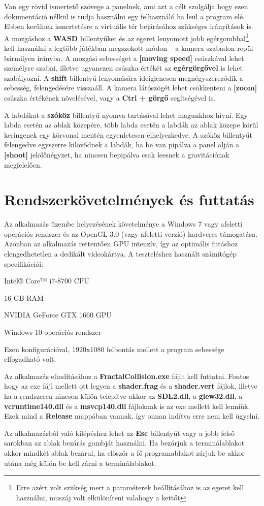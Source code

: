 Van egy rövid ismertető szövege a panelnek, ami azt a célt szolgálja hogy ezen dokumentáció nélkül is tudja használni egy felhasználó ha leül a program elé. Ebben kerülnek ismertetésre a virtuális tér bejárásához szükséges irányítások is. A mozgáshoz a \textbf{WASD} billentyűket és az egeret lenyomott jobb egérgombbal\footnote{Erre azért volt szükség mert a paraméterek beállításához is az egeret kell használni, muszáj volt elkülöníteni valahogy a kettőt} kell használni a legtöbb játékban megszokott módon -- a kamera szabadon repül bármilyen irányba. A mozgási sebességet a \textbf{[moving speed]} csúszkával lehet személyre szabni, illetve ugyanezen csúszka értékét az \textbf{egérgörgővel} is lehet szabályozni. A \textbf{shift} billentyű lenyomására ideiglenesen megnégyszereződik a sebesség, felengedésére visszaáll. A kamera látószögét lehet csökkenteni a \textbf{[zoom]} csúszka értékének növelésével, vagy a \textbf{Ctrl + görgő} segítségével is.

A labdákat a \textbf{szóköz} billentyű nyomva tartásával lehet magunkhoz hívni. Egy labda esetén az ablak közepére, több labda esetén a labdák az ablak közepe körül keringenek egy körvonal mentén egyenletesen elhelyezkedve. A szóköz billentyűt felengedve egyszerre kilövődnek a labdák, ha be van pipálva a panel alján a \textbf{[shoot]} jelölőnégyzet, ha nincsen bepipálva csak leesnek a gravitációnak megfelelően.
 
\cleardoublepage
\section{Rendszerkövetelmények és futtatás} 
\label{sec:futtatas} 
Az alkalmazás üzembe helyezésének követelménye a Windows 7 vagy afeletti operációs rendszer és az OpenGL 3.0 (vagy afeletti verzió) hardveres támogatása. Azonban az alkalmazás rettentően GPU intenzív, így az optimális futáshoz elengedhetetlen a dedikált videokártya. A teszteléshez használt számítógép specifikációi:
\begin{compactitem}
	\item Intel® Core™ i7-8700 CPU
	\item 16 GB RAM
	\item NVIDIA GeForce GTX 1660 GPU
	\item Windows 10 operációs rendszer
\end{compactitem}
Ezen konfigurációval, 1920x1080 felbontás mellett a program sebessége elfogadható volt.

Az alkalmazás elindításához a \textbf{FractalCollision.exe} fájlt kell futtatni. Fontos hogy az exe fájl mellett ott legyen a \textbf{shader.frag} és a \textbf{shader.vert} fájlok, illetve ha a rendszeren nincsen külön telepítve akkor az \textbf{SDL2.dll}, a \textbf{glew32.dll}, a \textbf{vcruntime140.dll} és a \textbf{msvcp140.dll} fájloknak is az exe mellett kell lenniük. Ezek mind a \textbf{Release} mappában vannak, így onnan indítva erre nem kell ügyelni.

Az alkalmazásból való kilépéshez lehet az \textbf{Esc} billentyűt vagy a jobb felső sarokban az ablak bezárás gombját használni. Ha bezárjuk a terminálablakot akkor mindkét ablak bezárul, ha először a fő programablakot zárjuk be akkor utána még külön be kell zárni a terminálablakot.


